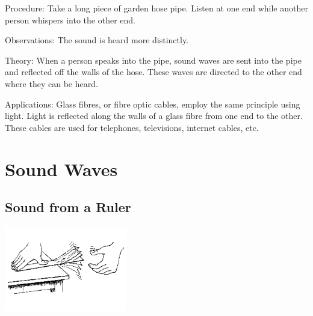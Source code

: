 \begin{multicols}{2}
\begin{description*}
\item[Procedure:]{Take a long piece of garden hose pipe. Listen at one end while another person whispers into the other end.}
\item[Observations:]{The sound is heard more distinctly.}
\item[Theory:]{When a person speaks into the pipe, sound waves are sent into the pipe and reflected off the walls of the hose. These waves are directed to the other end where they can be heard.}
\item[Applications:]{Glass fibres, or fibre optic cables, employ the same principle using light. Light is reflected along the walls of a glass fibre from one end to the other. These cables are used for telephones, televisions, internet cables, etc.}
\end{description*}


\section*{Sound Waves}


\subsection{Sound from a Ruler}

\begin{center}
\includegraphics[width=0.4\textwidth]{./img/source/sound-ruler.png}
\end{center}


\end{multicols}
